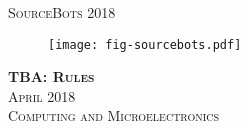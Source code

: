 \documentclass[twoside,12pt,a4paper,titlepage]{article}
\title{\gamename}
\author{\org}
\date{\timeline}
\newcommand{\gamename}{TBA\xspace}
\newcommand{\timeline}{April 2018\xspace}
\begin{document}
\begin{titlepage}
\begin{center}
\textsc{\large SourceBots 2018}\\[3.5cm]
\begin{figure}
    \centering
    \texttt{[image: fig-sourcebots.pdf]}
\end{figure}
\textsc{\huge \textbf{\gamename{}: Rules}}\\[1cm]
\textsc{\large \timeline}\\[3cm]
\textsc{\Large Computing and Microelectronics}
\end{center}
\end{titlepage}


\clearpage

\clearpage

\end{document}
